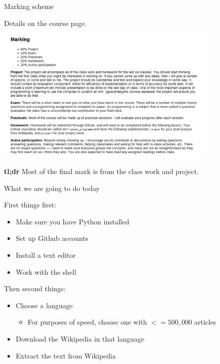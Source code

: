 \documentclass[10pt, compress]{beamer}
\begin{document}
\begin{frame}{Marking scheme}

Details on the course page.

\begin{center}
 \includegraphics[width=0.8\textwidth]{graphics/course-page-marking.png}
\end{center}

\textbf{tl;dr} Most of the final mark is from the class work and project.

\end{frame}


\begin{frame}{What we are going to do today}

First things first:
\begin{itemize}
  \item Make sure you have Python installed
  \item Set up Github accounts
  \item Install a text editor
  \item Work with the shell
\end{itemize}

Then second things:
\begin{itemize}
  \item Choose a language 
  \begin{itemize}
    \item For purposes of speed, choose one with $<= 500,000$ articles
  \end{itemize}
  \item Download the Wikipedia in that language 
  \item Extract the text from Wikipedia
\end{itemize}



\end{frame}
\end{document}
